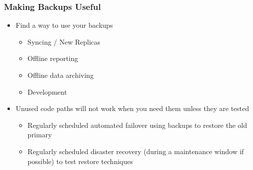 \begin{frame}
    \frametitle{Making Backups Useful}

    \begin{itemize}
        \item Find a way to use your backups

        \begin{itemize}
            \item Syncing / New Replicas
            \item Offline reporting
            \item Offline data archiving
            \item Development
        \end{itemize}

        \item Unused code paths will not work when you need them unless they are tested

        \begin{itemize}
            \item Regularly scheduled automated failover using backups to restore the old primary
            \item Regularly scheduled disaster recovery (during a maintenance window if possible) to test restore techniques
        \end{itemize}
    \end{itemize}
\end{frame}

%
%
%
%
%
%
%

